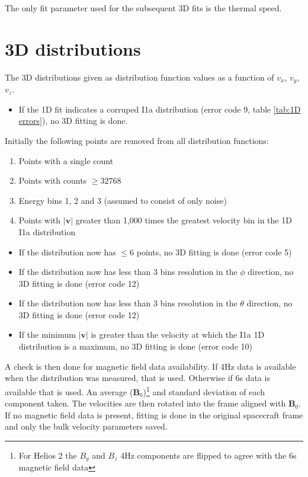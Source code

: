 \documentclass[11pt,a4paper]{article}
\begin{document}
The only fit parameter used for the subsequent 3D fits is the thermal speed.

\section{3D distributions}
The 3D distributions given as distribution function values as a function of $v_{x}$, $v_{y}$, $v_{z}$.
\begin{itemize}
	\item If the 1D fit indicates a corruped I1a distribution (error code 9, table \ref{tab:1D errors}), no 3D fitting is done.
\end{itemize}
Initially the following points are removed from all distribution functions:
\begin{enumerate}
	\item Points with a single count
	\item Points with counts $\geq 32768$
	\item Energy bins 1, 2 and 3 (assumed to consist of only noise)
	\item Points with $\left | \mathbf{v} \right |$ greater than 1,000 times the greatest velocity bin in the 1D I1a distribution
\end{enumerate}

\begin{itemize}
	\item If the distribution now has $\leq 6$ points, no 3D fitting is done (error code 5)
	\item If the distribution now has less than 3 bins resolution in the $\phi$ direction, no 3D fitting is done (error code 12)
	\item If the distribution now has less than 3 bins resolution in the $\theta$ direction, no 3D fitting is done (error code 12)
	\item If the minimum $\left | \mathbf{v} \right |$ is greater than the velocity at which the I1a 1D distribution is a maximum, no 3D fitting is done (error code 10)
\end{itemize}

A check is then done for magnetic field data availability. If 4Hz data is available when the distribution was measured, that is used. Otherwise if 6s data is available that is used. An average ($\mathbf{B}_{0}$)\footnote{For Helios 2 the $B_y$ and $B_z$ 4Hz components are flipped to agree with the 6s magnetic field data} and standard deviation of each component taken. The velocities are then rotated into the frame aligned with $\mathbf{B}_{0}$. If no magnetic field data is present, fitting is done in the original spacecraft frame and only the bulk velocity parameters saved.
\end{document}
